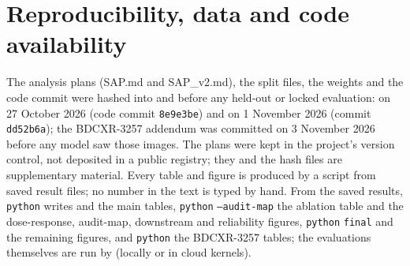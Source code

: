 \section{Reproducibility, data and code availability}
\label{sec:repro}
The analysis plans (SAP.md and SAP\_v2.md), the split files, the weights and the code commit were hashed into  and
 before any held-out or locked evaluation:  on 27 October 2026 (code commit \texttt{8e9e3be}) and
 on 1 November 2026 (commit \texttt{dd52b6a}); the BDCXR-3257 addendum was committed on 3 November 2026 before any model
saw those images. The plans were kept in the project's version control, not deposited in a public registry; they and the hash files are
supplementary material. Every table and figure is produced by a script from saved result files; no number in the text is typed by hand. From the saved
results, \texttt{python}  writes  and the main tables, \texttt{python}  \texttt{--audit-map} the ablation table and the dose-response, audit-map, downstream and reliability figures, \texttt{python}  \texttt{final}
and  the remaining figures, and \texttt{python}  the BDCXR-3257 tables; the
evaluations themselves are run by  (locally or in cloud kernels). 

